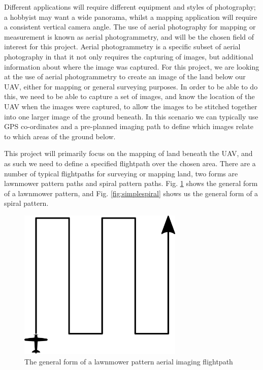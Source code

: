 Different applications will require different equipment and styles of photography; a hobbyist may want a wide panorama, whilst a mapping application will require a consistent vertical camera angle. The use of aerial photography for mapping or measurement is known as aerial photogrammetry, and will be the chosen field of interest for this project. Aerial photogrammetry is a specific subset of aerial photography in that it not only requires the capturing of images, but additional information about where the image was captured. For this project, we are looking at the use of aerial photogrammetry to create an image of the land below our UAV, either for mapping or general surveying purposes. In order to be able to do this, we need to be able to capture a set of images, and know the location of the UAV when the images were captured, to allow the images to be stitched together into one larger image of the ground beneath. In this scenario we can typically use GPS co-ordinates and a pre-planned imaging path to define which images relate to which areas of the ground below. %


This project will primarily focus on the mapping of land beneath the UAV, and as such we need to define a specified flightpath over the chosen area. There are a number of typical flightpaths for surveying or mapping land, two forms are lawnmower pattern paths and spiral pattern paths. Fig. \ref{fig:simplelawnmower} shows the general form of a lawnmower pattern, and Fig. \ref{fig:simplespiral} shows us the general form of a spiral pattern.

\begin{figure}[htbp!] 
\centering    
\includegraphics[width=0.7\textwidth]{SimpleLawnmower}
\caption[Simple Lawnmower Pattern]{The general form of a lawnmower pattern aerial imaging flightpath}
\label{fig:simplelawnmower}
\end{figure}

